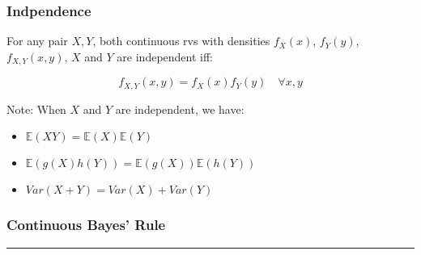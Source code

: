 \documentclass{article}
\begin{document}
\subsubsection{Indpendence}

For any pair $X,Y$, both continuous rvs with densities $f_X(x)$,
$f_Y(y)$, $f_{X,Y}(x,y)$, $X$ and $Y$ are independent iff:

\begin{equation}
  \tag{Independence: Continuous}
  \boxed{
    f_{X,Y}(x,y) = f_X(x)f_Y(y) \quad \forall x, y
  }
\end{equation}

Note: When $X$ and $Y$ are independent, we have:

\begin{itemize}
\item $\mathbb{E}(XY) = \mathbb{E}(X)\mathbb{E}(Y)$
\item $\mathbb{E}(g(X)h(Y)) = \mathbb{E}(g(X))\mathbb{E}(h(Y))$
\item $Var(X+Y) = Var(X)+Var(Y)$
\end{itemize}

\subsubsection{Continuous Bayes' Rule}


\medskip\hrule
\end{document}
